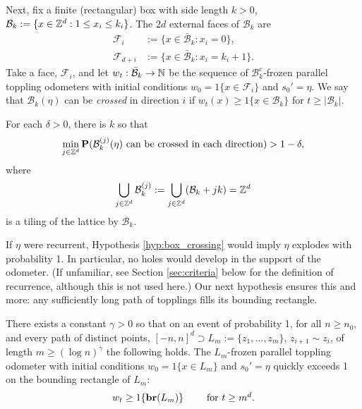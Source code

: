 \documentclass[12pt]{amsart}
\begin{document}
Next, fix a finite (rectangular) box with side length $k > 0$,  $\mathcal{B}_{k} := \{ x \in \mathbb{Z}^d : 1 \leq x_i \leq k_i \}$.
The $2 d$ external faces of $\mathcal{B}_k$ are 
\[
\begin{aligned}
\mathcal{F}_i &:= \{ x \in \bar{\mathcal{B}}_k : x_i = 0\}, \\
\mathcal{F}_{d+i} &:= \{x \in \bar{\mathcal{B}}_k : x_i = k_i+1\}.
\end{aligned}
\]
Take a face, $\mathcal{F}_i$, and let $w_t: \bar{\mathcal{B}}_k \to \mathbb{N}$ be the sequence of $\mathcal{B}_k^c$-frozen parallel toppling odometers with initial conditions  $w_0 = 1\{ x \in \mathcal{F}_i\}$ and $s_0' = \eta$. We say that $\mathcal{B}_k(\eta)$ can be {\it crossed} in direction $i$ if $w_{t}(x) \geq 1\{x \in \mathcal{B}_k \}$ for $t \geq |\mathcal{B}_k|$. 


\begin{hyp} \label{hyp:box_crossing}
	For each $\delta > 0$, there is $k$ so that 
	\[
	\min_{j \in \mathbb{Z}^d} \mathbf{P}(\mathcal{B}^{(j)}_k(\eta) \mbox{ can be crossed in each direction}) > 1 - \delta, 
	\]
	where 
	\[
	\bigcup_{j \in \mathbb{Z}^d} \mathcal{B}^{(j)}_{k} := \bigcup_{j \in \mathbb{Z}^d} (\mathcal{B}_k + j  k) = \mathbb{Z}^d
	\]
	is a tiling of the lattice by $\mathcal{B}_k$.
	
\end{hyp}
If $\eta$ were recurrent, Hypothesis \ref{hyp:box_crossing} would imply $\eta$ explodes with probability 1. In particular,  no holes would develop in the support of the odometer. (If unfamiliar, see Section \ref{sec:criteria}
below for the definition of recurrence, although this is not used here.) Our next hypothesis 
ensures this and more: any sufficiently long path of topplings fills its bounding rectangle.

\begin{hyp} \label{hyp:path_filling}
	There exists a constant $\gamma > 0$ so that on an event of probability 1, for all $n \geq n_0$, and every path of
	distinct points, $[-n,n]^d \supset L_m := \{z_1, \ldots, z_m\}$, $z_{i+1} \sim z_i$, of length $m \geq  (\log n)^{\gamma}$ the following holds. 
	The $L_m$-frozen parallel toppling odometer with initial conditions $w_0 = 1\{ x \in L_m\}$ and $s_0' = \eta$
	quickly exceeds 1 on the bounding rectangle of $L_m$:
	\[
	w_t \geq 1 \{ \mathbf{br}(L_m) \}  \qquad \mbox{ for $t \geq m^d$.}  
	\]
\end{hyp}
\end{document}
